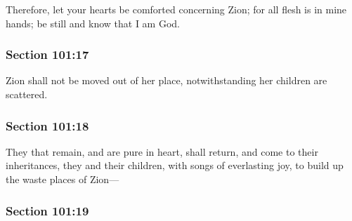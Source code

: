 		Therefore, let your hearts be comforted concerning Zion; for all flesh is in mine hands; be still and know that I am God.


	\subsubsection{Section 101:17} %
		\label{DC101-17}

		Zion shall not be moved out of her place, notwithstanding her children are scattered.


	\subsubsection{Section 101:18} %
		\label{DC101-18}

		They that remain, and are pure in heart, shall return, and come to their inheritances, they and their children, with songs of everlasting joy, to build up the waste places of Zion---


	\subsubsection{Section 101:19} %
		\label{DC101-19}

